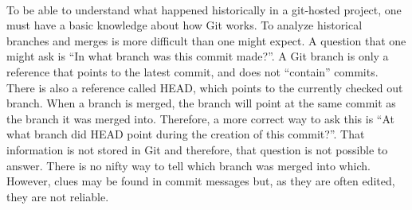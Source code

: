 \paragraph*{}
To be able to understand what happened historically in a git-hosted project, one must have a basic knowledge about how Git works. To analyze historical branches and merges is more difficult than one might expect. A question that one might ask is “In what branch was this commit made?”. A Git branch is only a reference that points to the latest commit, and does not “contain” commits. There is also a reference called HEAD, which points to the currently checked out branch. When a branch is merged, the branch will point at the same commit as the branch it was merged into. Therefore, a more correct way to ask this is “At what branch did HEAD point during the creation of this commit?”. That information is not stored in Git and therefore, that question is not possible to answer. There is no nifty way to tell which branch was merged into which. However, clues may be found in commit messages but, as they are often edited, they are not reliable.
